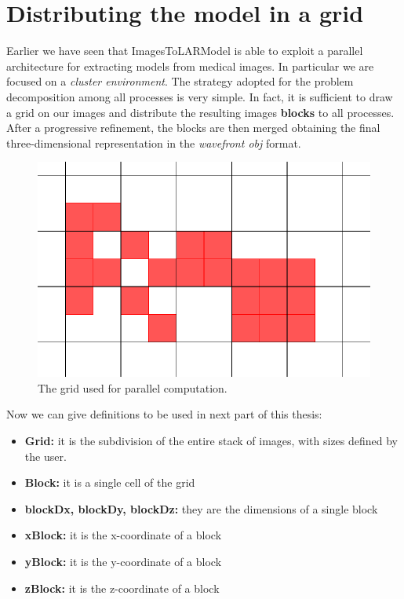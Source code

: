 \section{Distributing the model in a grid}\label{sec31:Grid}

Earlier we have seen that ImagesToLARModel is able to exploit a parallel architecture for extracting models from medical images. In particular we are focused on a \textit{cluster environment}. The strategy adopted for the problem decomposition among all processes is very simple. In fact, it is sufficient to draw a grid on our images and distribute the resulting images \textbf{blocks} to all processes. After a progressive refinement, the blocks are then merged obtaining the final three-dimensional representation in the \textit{wavefront obj} format.

\begin{figure}[htb] %
   \centering
   \includegraphics[width=0.50\linewidth]{images/imageGrid.pdf}  
   \caption[The grid used for parallel computation]{The grid used for parallel computation.}
   \label{fig:grid}
\end{figure}

Now we can give definitions to be used in next part of this thesis:

\begin{itemize}
 \item \textbf{Grid:} it is the subdivision of the entire stack of images, with sizes defined by the user.
 \item \textbf{Block:} it is a single cell of the grid
 \item \textbf{blockDx, blockDy, blockDz:} they are the dimensions of a single block
 \item \textbf{xBlock:} it is the x-coordinate of a block
 \item \textbf{yBlock:} it is the y-coordinate of a block
 \item \textbf{zBlock:} it is the z-coordinate of a block
\end{itemize}

